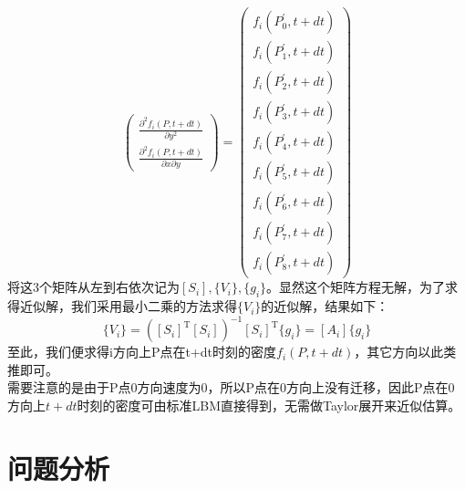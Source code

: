 \documentclass[UTF8]{ctexart}
\begin{document}
\begin{equation}
{\begin{pmatrix}
\frac{\partial^{2} f_i(P,t+dt)}{\partial y^{2}} \\
\frac{\partial^{2} f_i(P,t+dt)}{{\partial x} {\partial y}}
\end{pmatrix}}
={\begin{pmatrix}
f_i(P_0^\prime,t+dt) \\
f_i(P_1^\prime,t+dt) \\
f_i(P_2^\prime,t+dt) \\ 
f_i(P_3^\prime,t+dt) \\ 
f_i(P_4^\prime,t+dt) \\ 
f_i(P_5^\prime,t+dt) \\
f_i(P_6^\prime,t+dt) \\
f_i(P_7^\prime,t+dt) \\
f_i(P_8^\prime,t+dt)
\end{pmatrix}}
\end{equation}
\indent 将这3个矩阵从左到右依次记为$[S_i],\{V_i\},\{g_i\}$。显然这个矩阵方程无解，为了求得近似解，我们采用最小二乘的方法求得$\{V_i\}$的近似解，结果如下：
\begin{equation}
\{V_i\}=({[S_i]}^ \mathrm{T} {[S_i]})^{-1} {[S_i]}^ \mathrm{T} \{g_i\} = [A_i] \{g_i\}
\end{equation}
\indent 至此，我们便求得i方向上P点在t+dt时刻的密度$f_i(P,t+dt)$，其它方向以此类推即可。\\
\indent 需要注意的是由于P点0方向速度为0，所以P点在0方向上没有迁移，因此P点在0方向上$t+dt$时刻的密度可由标准LBM直接得到，无需做Taylor展开来近似估算。

\clearpage

\section{问题分析}
\end{document}
